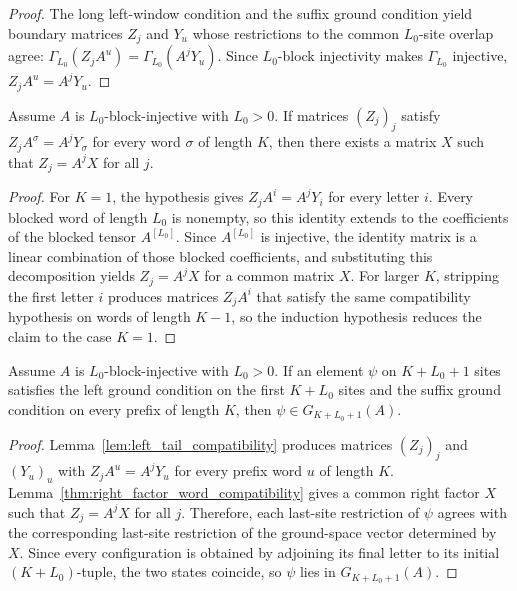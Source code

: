 \begin{proof}
    \leanok
    The long left-window condition and the suffix ground condition yield
    boundary matrices $Z_j$ and $Y_u$ whose restrictions to the common
    $L_0$-site overlap agree:
    $\Gamma_{L_0}(Z_jA^u)=\Gamma_{L_0}(A^jY_u)$. Since $L_0$-block injectivity
    makes $\Gamma_{L_0}$ injective, $Z_jA^u=A^jY_u$.
\end{proof}

\begin{lemma}%
    \label{thm:right_factor_word_compatibility}
    \leanok
    Assume $A$ is $L_0$-block-injective with $L_0 > 0$. If matrices $(Z_j)_j$
    satisfy $Z_jA^\sigma=A^jY_\sigma$ for every word $\sigma$ of length $K$,
    then there exists a matrix $X$ such that $Z_j=A^jX$ for all $j$.
\end{lemma}

\begin{proof}
    \leanok
    For $K = 1$, the hypothesis gives $Z_jA^i=A^jY_i$ for every letter $i$.
    Every blocked word of length $L_0$ is nonempty, so this identity extends to
    the coefficients of the blocked tensor $A^{[L_0]}$. Since $A^{[L_0]}$ is
    injective, the identity matrix is a linear combination of those blocked
    coefficients, and substituting this decomposition yields $Z_j=A^jX$ for a
    common matrix $X$. For larger $K$, stripping the first letter $i$ produces
    matrices $Z_jA^i$ that satisfy the same compatibility hypothesis on words of
    length $K-1$, so the induction hypothesis reduces the claim to the case
    $K=1$.
\end{proof}

\begin{lemma}%
    \label{thm:ground_space_extend_right_block_injective}
    \leanok
    Assume $A$ is $L_0$-block-injective with $L_0 > 0$. If an element $\psi$
    on $K+L_0+1$ sites satisfies the left ground condition on the first
    $K+L_0$ sites and the suffix ground condition on every prefix of length
    $K$, then $\psi \in G_{K+L_0+1}(A)$.
\end{lemma}

\begin{proof}
    \leanok
    Lemma~\ref{lem:left_tail_compatibility} produces matrices $(Z_j)_j$ and
    $(Y_u)_u$ with $Z_jA^u=A^jY_u$ for every prefix word $u$ of length $K$.
    Lemma~\ref{thm:right_factor_word_compatibility} gives a common right
    factor $X$ such that $Z_j=A^jX$ for all $j$. Therefore, each last-site
    restriction of $\psi$ agrees with the corresponding last-site restriction
    of the ground-space vector determined by $X$. Since every configuration is
    obtained by adjoining its final letter to its initial $(K+L_0)$-tuple, the
    two states coincide, so $\psi$ lies in $G_{K+L_0+1}(A)$.
\end{proof}

